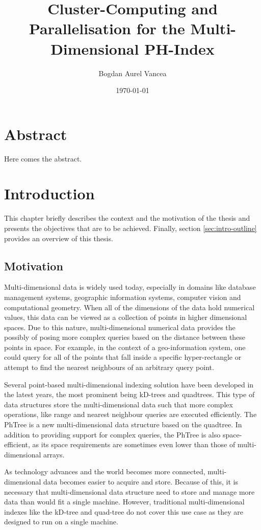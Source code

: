 \documentclass[11pt,a4paper]{globis-book}
\title{Cluster-Computing and Parallelisation for the
    Multi-Dimensional PH-Index}
\author{Bogdan Aurel Vancea}
\institute{Institute of Information Systems}
\date{\today}
\begin{document}
\frontmatter
\maketitlepage
\cleardoublepage
{}

\chapter*{Abstract}

Here comes the abstract.

\tableofcontents

\mainmatter


\chapter{Introduction}
\label{ch:intro}
This chapter briefly describes the context and the motivation of the thesis and presents the objectives that are to be achieved. Finally, section \ref{sec:intro-outline} provides an overview of this thesis.

\section{Motivation}
\label{sec:intro-motivation}
Multi-dimensional data is widely used today, especially in domains like database management systems, geographic information systems, computer vision and computational geometry. When all of the dimensions of the data hold numerical values, this data can be viewed as a collection of points in higher dimensional spaces. Due to this nature, multi-dimensional numerical data provides the possibly of posing more complex queries based on the distance between these points in space. For example, in the context of a geo-information system, one could query for all of the points that fall inside a specific hyper-rectangle or attempt to find the nearest neighbours of an arbitrary query point.

Several point-based multi-dimensional indexing solution have been developed in the latest years, the most prominent being kD-trees and quadtrees. This type of data structures store the multi-dimensional data such that more complex operations, like range and nearest neighbour queries are executed efficiently. The PhTree is a new multi-dimensional data structure based on the quadtree. In addition to providing support for complex queries, the PhTree is also space-efficient, as its space requirements are sometimes even lower than those of multi-dimensional arrays. 

As technology advances and the world becomes more connected, multi-dimensional data becomes easier to acquire and store. Because of this, it is necessary that multi-dimensional data structure need to store and manage more data than would fit a single machine. However, traditional multi-dimensional indexes like the kD-tree and quad-tree do not cover this use case as they are designed to run on a single machine.
\end{document}
